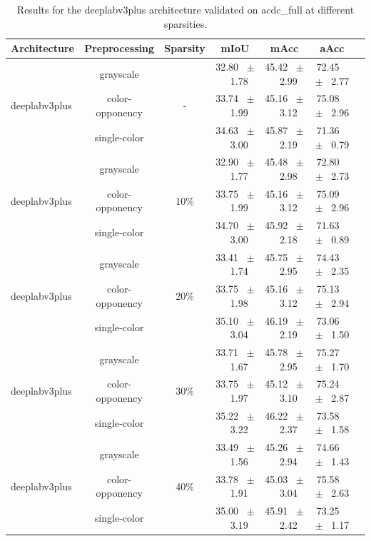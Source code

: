 \begin{table}[h]
  \centering
  \caption{Results for the deeplabv3plus architecture validated on acdc_full at different sparsities.}
  \begin{tabular}{@{}lccc ccc@{}}
    \toprule
    Architecture & Preprocessing & Sparsity & mIoU & mAcc & aAcc \\
    \midrule

    \multirow{3}{*}{deeplabv3plus} & grayscale & \multirow{3}{*}{-} & 32.80 ~$\pm$~ 1.78 & 45.42 ~$\pm$~ 2.99 & 72.45 ~$\pm$~ 2.77 \\
    & color-opponency &  & 33.74 ~$\pm$~ 1.99 & 45.16 ~$\pm$~ 3.12 & 75.08 ~$\pm$~ 2.96 \\
    & single-color &  & 34.63 ~$\pm$~ 3.00 & 45.87 ~$\pm$~ 2.19 & 71.36 ~$\pm$~ 0.79 \\
    \midrule
    \multirow{3}{*}{deeplabv3plus} & grayscale & \multirow{3}{*}{10\%} & 32.90 ~$\pm$~ 1.77 & 45.48 ~$\pm$~ 2.98 & 72.80 ~$\pm$~ 2.73 \\
    & color-opponency &  & 33.75 ~$\pm$~ 1.99 & 45.16 ~$\pm$~ 3.12 & 75.09 ~$\pm$~ 2.96 \\
    & single-color &  & 34.70 ~$\pm$~ 3.00 & 45.92 ~$\pm$~ 2.18 & 71.63 ~$\pm$~ 0.89 \\
    \midrule
    \multirow{3}{*}{deeplabv3plus} & grayscale & \multirow{3}{*}{20\%} & 33.41 ~$\pm$~ 1.74 & 45.75 ~$\pm$~ 2.95 & 74.43 ~$\pm$~ 2.35 \\
    & color-opponency &  & 33.75 ~$\pm$~ 1.98 & 45.16 ~$\pm$~ 3.12 & 75.13 ~$\pm$~ 2.94 \\
    & single-color &  & 35.10 ~$\pm$~ 3.04 & 46.19 ~$\pm$~ 2.19 & 73.06 ~$\pm$~ 1.50 \\
    \midrule
    \multirow{3}{*}{deeplabv3plus} & grayscale & \multirow{3}{*}{30\%} & 33.71 ~$\pm$~ 1.67 & 45.78 ~$\pm$~ 2.95 & 75.27 ~$\pm$~ 1.70 \\
    & color-opponency &  & 33.75 ~$\pm$~ 1.97 & 45.12 ~$\pm$~ 3.10 & 75.24 ~$\pm$~ 2.87 \\
    & single-color &  & 35.22 ~$\pm$~ 3.22 & 46.22 ~$\pm$~ 2.37 & 73.58 ~$\pm$~ 1.58 \\
    \midrule
    \multirow{3}{*}{deeplabv3plus} & grayscale & \multirow{3}{*}{40\%} & 33.49 ~$\pm$~ 1.56 & 45.26 ~$\pm$~ 2.94 & 74.66 ~$\pm$~ 1.43 \\
    & color-opponency &  & 33.78 ~$\pm$~ 1.91 & 45.03 ~$\pm$~ 3.04 & 75.58 ~$\pm$~ 2.63 \\
    & single-color &  & 35.00 ~$\pm$~ 3.19 & 45.91 ~$\pm$~ 2.42 & 73.25 ~$\pm$~ 1.17 \\

\end{tabular}
\end{table}
